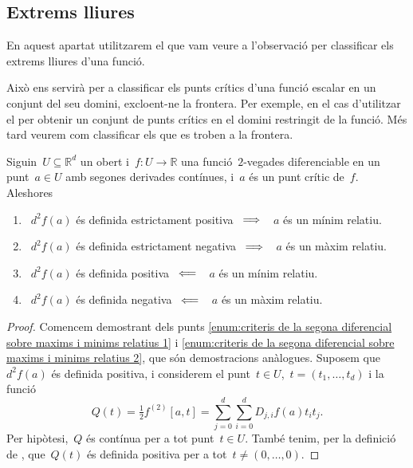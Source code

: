 \documentclass[../../main.tex]{subfiles}
\begin{document}
    \subsection{Extrems lliures}\label{sec:Classificar extrems lliures}
    En aquest apartat utilitzarem el que vam veure a l'observació  per classificar els extrems lliures d'una funció.

    Això ens servirà per a classificar els punts crítics d'una funció escalar en un conjunt del seu domini, excloent-ne la frontera.
    Per exemple, en el cas d'utilitzar el  per obtenir un conjunt de punts crítics en el domini restringit de la funció.
    Més tard veurem com classificar els que es troben a la frontera.
    \begin{proposition}\label{prop:criteris de la segona diferencial sobre maxims i minims relatius}
        Siguin~\(U\subseteq\mathbb{R}^{d}\) un obert i~\(f\colon U\to\mathbb{R}\) una funció~\(2\)-vegades diferenciable en un punt~\(a\in U\) amb segones derivades contínues, i~\(a\) és un punt crític de~\(f\).
        Aleshores
        \begin{enumerate}
            \item\label{enum:criteris de la segona diferencial sobre maxims i minims relatius 1}~\(d^{2}f(a)\) és definida estrictament positiva~\(\implies\) ~\(a\) és un mínim relatiu.
            \item\label{enum:criteris de la segona diferencial sobre maxims i minims relatius 2}~\(d^{2}f(a)\) és definida estrictament negativa~\(\implies\) ~\(a\) és un màxim relatiu.
            \item\label{enum:criteris de la segona diferencial sobre maxims i minims relatius 3}~\(d^{2}f(a)\) és definida positiva~\(\impliedby\) ~\(a\) és un mínim relatiu.
            \item\label{enum:criteris de la segona diferencial sobre maxims i minims relatius 4}~\(d^{2}f(a)\) és definida negativa~\(\impliedby\) ~\(a\) és un màxim relatiu.
        \end{enumerate}
        \begin{proof}
            Comencem demostrant dels punts \eqref{enum:criteris de la segona diferencial sobre maxims i minims relatius 1} i \eqref{enum:criteris de la segona diferencial sobre maxims i minims relatius 2}, que són demostracions anàlogues.
            Suposem que~\(d^{2}f(a)\) és definida positiva, i considerem el punt~\(t\in U\),~\(t=(t_{1},\dots,t_{d})\) i la funció
            \[
                Q(t)=\tfrac{1}{2}f^{(2)}[a,t]=\sum_{j=0}^{d}\sum_{i=0}^{d}D_{j,i}f(a)t_{i}t_{j}.
            \]
            Per hipòtesi,~\(Q\) és contínua per a tot punt~\(t\in U\).
            També tenim, per la definició de , que~\(Q(t)\) és definida positiva per a tot~\(t\neq(0,\dots,0)\).


\end{proof}
\end{proposition}
\end{document}
